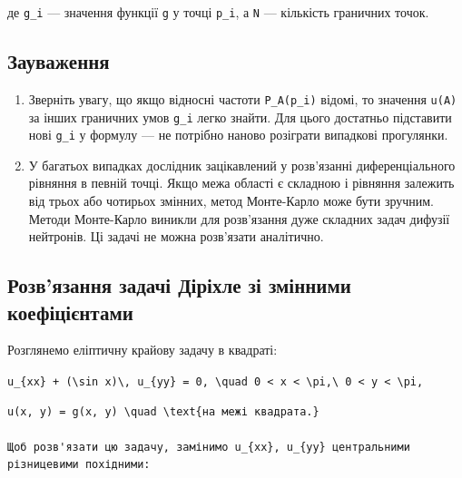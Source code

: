 \documentclass[
  ukrainian,
]{article}
\begin{document}
де \texttt{g\_i} --- значення функції \texttt{g} у точці \texttt{p\_i},
а \texttt{N} --- кількість граничних точок.

\subsection{Зауваження}\label{ux437ux430ux443ux432ux430ux436ux435ux43dux43dux44f-8}

\begin{enumerate}
\def\labelenumi{\arabic{enumi}.}
\item
  Зверніть увагу, що якщо відносні частоти \texttt{P\_A(p\_i)} відомі,
  то значення \texttt{u(A)} за інших граничних умов \texttt{g\_i} легко
  знайти. Для цього достатньо підставити нові \texttt{g\_i} у формулу
  --- не потрібно наново розіграти випадкові прогулянки.
\item
  У багатьох випадках дослідник зацікавлений у розв'язанні
  диференціального рівняння в певній точці. Якщо межа області є складною
  і рівняння залежить від трьох або чотирьох змінних, метод Монте-Карло
  може бути зручним. Методи Монте-Карло виникли для розв'язання дуже
  складних задач дифузії нейтронів. Ці задачі не можна розв'язати
  аналітично.
\end{enumerate}

\subsection{Розв'язання задачі Діріхле зі змінними
коефіцієнтами}\label{ux440ux43eux437ux432ux44fux437ux430ux43dux43dux44f-ux437ux430ux434ux430ux447ux456-ux434ux456ux440ux456ux445ux43bux435-ux437ux456-ux437ux43cux456ux43dux43dux438ux43cux438-ux43aux43eux435ux444ux456ux446ux456ux454ux43dux442ux430ux43cux438}

Розглянемо еліптичну крайову задачу в квадраті:

\texttt{\textquotesingle{}u\_\{xx\}\textquotesingle{}\ +\ (\textbackslash{}sin\ x)\textbackslash{},\ \textquotesingle{}u\_\{yy\}\ =\ 0,\ \textbackslash{}quad\ 0\ \textless{}\ x\ \textless{}\ \textbackslash{}pi,\textbackslash{}\ 0\ \textless{}\ y\ \textless{}\ \textbackslash{}pi\textquotesingle{},}

\begin{verbatim}
u(x, y) = g(x, y) \quad \text{на межі квадрата.}

Щоб розв'язати цю задачу, замінимо u_{xx}, u_{yy} центральними різницевими похідними:
\end{verbatim}
\end{document}

